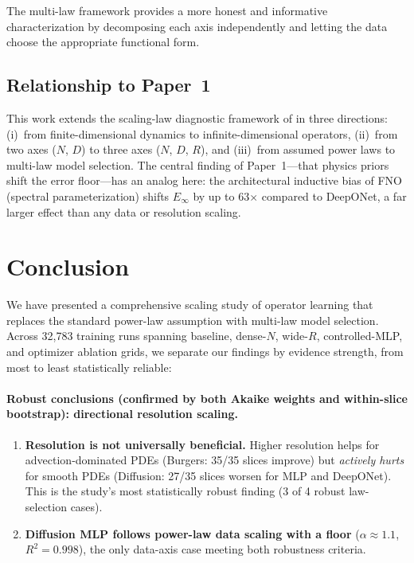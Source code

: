 \documentclass[11pt]{article}
\newcommand{\Einf}{E_\infty}
\newcommand{\totalRuns}{32{,}783}
\begin{document}
\noindent The multi-law framework provides a more honest and
informative characterization by decomposing each axis independently
and letting the data choose the appropriate functional form.


\subsection{Relationship to Paper~1}

This work extends the scaling-law diagnostic framework of
\citet{perrier2025scaling} in three directions: (i)~from
finite-dimensional dynamics to infinite-dimensional operators,
(ii)~from two axes ($N$, $D$) to three axes ($N$, $D$, $R$), and
(iii)~from assumed power laws to multi-law model selection. The
central finding of Paper~1---that physics priors shift the error
floor---has an analog here: the architectural inductive bias of
FNO (spectral parameterization) shifts $\Einf$ by up to 63$\times$
compared to DeepONet, a far larger effect than any data or resolution
scaling.


\section{Conclusion}
\label{sec:conclusion}

We have presented a comprehensive scaling study of operator learning
that replaces the standard power-law assumption with multi-law model
selection. Across \totalRuns{} training runs spanning baseline,
dense-$N$, wide-$R$, controlled-MLP, and optimizer ablation grids,
we separate our findings by evidence strength, from most to least
statistically reliable:

\paragraph{Robust conclusions (confirmed by both Akaike weights and
within-slice bootstrap): directional resolution scaling.}
\begin{enumerate}
  \item \textbf{Resolution is not universally beneficial.} Higher
    resolution helps for advection-dominated PDEs (Burgers: 35/35
    slices improve) but \emph{actively hurts} for smooth PDEs
    (Diffusion: 27/35 slices worsen for MLP and DeepONet).
    This is the study's most statistically robust finding
    (3 of 4 robust law-selection cases).
  \item \textbf{Diffusion MLP follows power-law data scaling with
    a floor} ($\alpha \approx 1.1$, $R^2 = 0.998$), the only
    data-axis case meeting both robustness criteria.
\end{enumerate}
\end{document}
